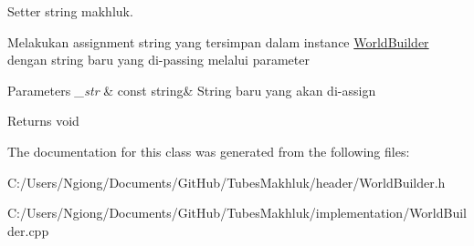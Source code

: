 Setter string makhluk. 

Melakukan assignment string yang tersimpan dalam instance \hyperlink{class_world_builder}{World\+Builder} dengan string baru yang di-\/passing melalui parameter 
\begin{DoxyParams}{Parameters}
{\em \+\_\+str} & const string\& String baru yang akan di-\/assign \\
\hline
\end{DoxyParams}
\begin{DoxyReturn}{Returns}
void 
\end{DoxyReturn}


The documentation for this class was generated from the following files\+:\begin{DoxyCompactItemize}
\item 
C\+:/\+Users/\+Ngiong/\+Documents/\+Git\+Hub/\+Tubes\+Makhluk/header/World\+Builder.\+h\item 
C\+:/\+Users/\+Ngiong/\+Documents/\+Git\+Hub/\+Tubes\+Makhluk/implementation/World\+Builder.\+cpp\end{DoxyCompactItemize}
